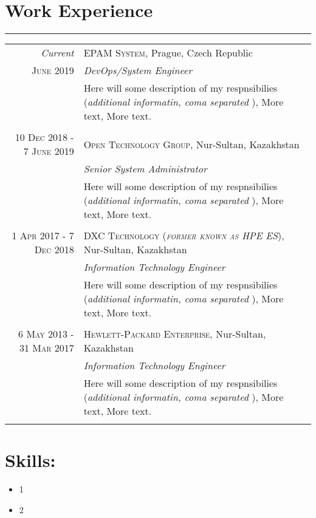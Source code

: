 \documentclass[a4paper,10pt]{article}
\begin{document}
\section*{Work Experience}
\vspace{-0.5ex}%
\rule{\textwidth}{0.3pt}
\vspace{-0.5ex}%
\begin{tabular}{r|p{11cm}}
\emph{Current} & \textsc{EPAM System}, Prague, Czech Republic \\
\textsc{June 2019} & \emph{DevOps/System Engineer}\\ 
& \footnotesize{Here will some description of my respnsibilies (\textit{additional informatin, coma separated} ), More text, More text.}\\
\multicolumn{2}{c}{} \\
\textsc{10 Dec 2018 - 7 June 2019} & \textsc{Open Technology Group}, Nur-Sultan, Kazakhstan \\
                                   & \emph{Senior System Administrator}\\
& \footnotesize{Here will some description of my respnsibilies (\textit{additional informatin, coma separated} ), More text, More text.}\\
\multicolumn{2}{c}{} \\
\textsc{1 Apr 2017 - 7 Dec 2018} & \textsc{DXC Technology (\textit{former known as HPE ES})}, Nur-Sultan, Kazakhstan \\
                                 & \emph{Information Technology Engineer}\\
& \footnotesize{Here will some description of my respnsibilies (\textit{additional informatin, coma separated} ), More text, More text.}\\
\multicolumn{2}{c}{} \\
\textsc{6 May 2013 - 31 Mar 2017} & \textsc{Hewlett-Packard Enterprise}, Nur-Sultan, Kazakhstan \\
                                  & \emph{Information Technology Engineer}\\
& \footnotesize{Here will some description of my respnsibilies (\textit{additional informatin, coma separated} ), More text, More text.}\\
\multicolumn{2}{c}{} \\

\end{tabular}
\section*{Skills:}
\begin{itemize}
    \item 1
    \item 2
\end{itemize}
\end{document}
